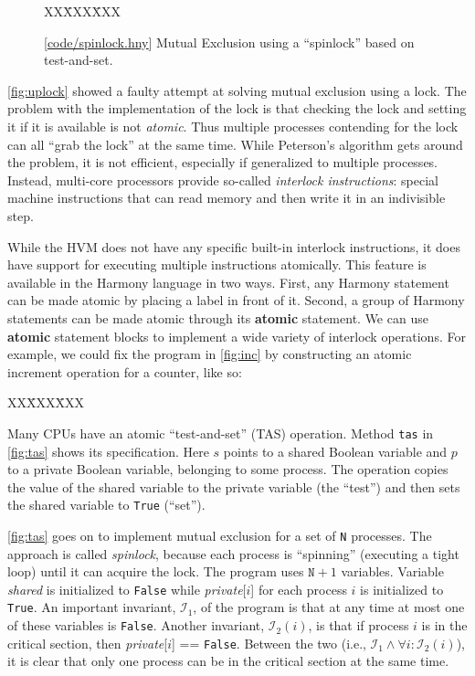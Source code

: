 \documentclass{report}
\newcommand{\harmonysource}[1]{
\begin{tabbing}
XX\=XXX\=XXX\kill
    
\end{tabbing}
}
\newcommand{\harmonylink}[1]{%
[\href{https://www.cs.cornell.edu/home/rvr/harmony/#1}{\underline{#1}}]%
}
\newenvironment{code}{
\tcolorbox
}{
\endtcolorbox
}
\begin{document}
\begin{figure}
\begin{code}
\harmonysource{spinlock}
\end{code}
\caption{\harmonylink{code/spinlock.hny} Mutual Exclusion using a ``spinlock'' based on test-and-set.}
\label{fig:tas}
\end{figure}

\autoref{fig:uplock} showed a faulty attempt at solving mutual
exclusion using a lock.  The problem with the implementation of the
lock is that checking the lock and setting it if it is available is
not \emph{atomic}.  Thus multiple processes contending for the lock
can all ``grab the lock'' at the same time.  While Peterson's
algorithm gets around the problem, it is not efficient, especially
if generalized to multiple processes.  Instead, multi-core processors provide
so-called \emph{interlock instructions}:
%
special machine instructions
that can read memory and then write it in an indivisible step.

%

While the HVM does not have any specific built-in interlock instructions,
it does have support for executing multiple instructions atomically.
This feature is available in the Harmony language in two ways.
First, any Harmony statement can be made atomic by placing a label in front
of it.  Second, a group of Harmony statements can be made atomic
through its \textbf{atomic}
%
statement.
We can use \textbf{atomic} statement blocks to implement a wide variety of
interlock operations.
For example, we could fix the program in \autoref{fig:inc} by
constructing an atomic increment operation for a counter, like so:
\begin{code}
\harmonysource{atomicinc}
\end{code}

Many CPUs have an atomic ``test-and-set'' (TAS)
%
%
operation.
Method \texttt{tas} in \autoref{fig:tas} shows its specification.
Here $s$ points to a shared Boolean variable and $p$
to a private Boolean variable, belonging to some process.
The operation copies the value of the shared variable to the
private variable (the ``test'')
and then sets the shared variable to \texttt{True} (``set'').

\autoref{fig:tas} goes on to implement mutual exclusion for
a set of \texttt{N} processes.
The approach is called \emph{spinlock},
%
because each process is ``spinning'' (executing a tight loop) until
it can acquire the lock.
The program uses $\mathtt{N}+1$ variables.
Variable \textit{shared} is initialized to \texttt{False} while
\textit{private}[$i$] for each process $i$ is initialized to \texttt{True}.
An important invariant, $\mathcal{I}_1$, of the program is that at any time at most
one of these variables is \texttt{False}.
Another invariant, $\mathcal{I}_2(i)$, is that if process $i$ is in the critical section,
then \textit{private}[$i$] == \texttt{False}.
Between the two (i.e., $\mathcal{I}_1 \land \forall i: \mathcal{I}_2(i)$),
it is clear that only one process can be in the
critical section at the same time.
\end{document}
